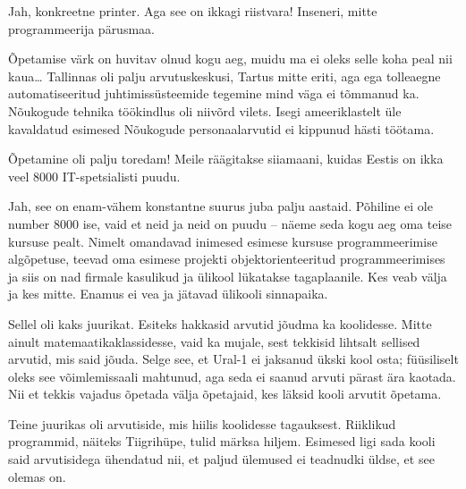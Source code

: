 
Jah, konkreetne printer. Aga see on ikkagi riistvara! Inseneri, mitte programmeerija pärusmaa.


Õpetamise värk on huvitav olnud kogu aeg, muidu ma ei oleks selle 
koha peal nii kaua\ldots{ }Tallinnas oli palju arvutuskeskusi, Tartus mitte eriti, aga ega
tolleaegne automatiseeritud juhtimissüsteemide 
tegemine mind väga ei tõmmanud ka. Nõukogude tehnika töökindlus oli niivõrd vilets. Isegi 
ameeriklastelt üle kavaldatud esimesed Nõukogude personaalarvutid ei kippunud 
hästi töötama. 

Õpetamine oli palju toredam! Meile räägitakse siiamaani, kuidas 
Eestis on ikka veel 8000 IT-spetsialisti puudu. 


Jah, see on enam-vähem konstantne suurus juba 
palju aastaid. Põhiline ei ole number 8000 ise, vaid
et neid ja neid on puudu -- näeme seda kogu aeg oma teise kursuse pealt. 
Nimelt omandavad inimesed esimese kursuse programmeerimise algõpetuse, teevad 
oma esimese projekti objektorienteeritud programmeerimises ja siis on nad 
firmale kasulikud ja ülikool lükatakse tagaplaanile. Kes veab välja 
ja kes mitte. Enamus ei vea ja jätavad ülikooli sinnapaika. 


Sellel oli kaks juurikat. Esiteks hakkasid arvutid 
jõudma ka koolidesse. Mitte ainult matemaatikaklassidesse, vaid ka mujale, sest 
tekkisid lihtsalt sellised arvutid, mis said jõuda. Selge see, et Ural-1 ei jaksanud ükski 
kool osta; füüsiliselt oleks see võimlemissaali mahtunud, 
aga seda ei saanud arvuti pärast ära kaotada. Nii et tekkis vajadus õpetada välja õpetajaid, kes 
läksid kooli arvutit õpetama. 

Teine juurikas oli arvutiside, mis hiilis koolidesse tagauksest. Riiklikud programmid, näiteks
Tiigrihüpe, tulid märksa hiljem. Esimesed ligi sada kooli said arvutisidega ühendatud nii, et paljud ülemused ei 
teadnudki üldse, et see olemas on. 

